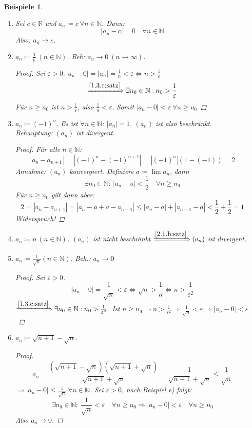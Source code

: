 \documentclass[14pt,titlepage,ngerman,a4paper,headsepline,DIV15,halfparskip*]{scrartcl}
\newcommand{\N}{\mathbb{N}}
\newcommand{\R}{\mathbb{R}}
\theoremstyle{named}
\theoremstyle{dotless}
\newtheorem*{beispiele}{Beispiele}
\begin{document}
\begin{beispiele}\
	\begin{enumerate}
		\item Sei $c \in \R$ und $a_{n} \coloneqq c ~\forall n \in \N$. Dann:
			$$
				| a_{n} - c | = 0 \quad \forall n \in \N
			$$
			Also: $a_{n} \rightarrow c$.
		\item $a_{n} \coloneqq \frac{1}{n} ~(n \in \N)$. Beh: $a_{n} \rightarrow 0 ~(n \rightarrow \infty)$.
			\begin{proof}
				Sei $\varepsilon > 0: |a_{n} - 0 | = |a_{n}| = \frac{1}{n} < \varepsilon \iff n > \frac{1}{\varepsilon}$
				$$
						\xRightarrow[]{\ref{1.3.c:satz}} \exists n_{0} \in \N: n_{0} > \frac{1}{\varepsilon}
				$$
				Für $n \geq n_{0}$ ist $n > \frac{1}{\varepsilon}$, also $\frac{1}{n} < \varepsilon$. Somit $|a_{n} - 0| < \varepsilon ~\forall n \geq n_{0}$
			\end{proof}
		\item $a_{n} \coloneqq (-1)^{n}$. Es ist $\forall n \in \N$: $|a_{n}| = 1$, $(a_{n})$ ist also beschränkt. Behauptung: $(a_{n})$ ist divergent.
			\begin{proof}
				Für alle $n \in \N$: 
				$$ |a_{n} - a_{n+1}| = |(-1)^{n} - (-1)^{n+1}| = |(-1)^{n}| \left( 1 - (-1) \right) = 2 $$
				Annahme: $(a_{n})$ konvergiert. Definiere $a \coloneqq \lim a_{n}$, dann 
				$$
					 \exists n_{0} \in \N: ~ |a_{n} - a| < \frac{1}{2} \quad \forall n \geq n_{0}
				$$
				Für $n \geq n_{0}$ gilt dann aber:
				$$
					2 = |a_{n} - a_{n+1}| = |a_{n} - a + a - a_{n + 1}| \leq |a_{n} - a| + |a_{n+1} - a| < \frac{1}{2} + \frac{1}{2} = 1
				$$
				Widerspruch!
			\end{proof}
		\item $a_{n} \coloneqq n ~(n \in \N)$. $(a_{n})$ ist nicht beschränkt $\xRightarrow[]{\ref{2.1.b:satz}} (a_{n})$ ist divergent.
		\item $a_{n} \coloneqq  \frac{1}{\sqrt{n}} (n \in \N)$. Beh.: $a_{n} \rightarrow 0$
			\begin{proof}
				Sei $\varepsilon > 0$.
				$$
					|a_{n} - 0| = \frac{1}{\sqrt{n}} < \varepsilon \iff \sqrt{n} > \frac{1}{n} \iff n > \frac{1}{\varepsilon^{2}}
				$$
				$\xRightarrow[]{\ref{1.3.c:satz}} \exists n_{0} \in \N: n_{0} > \frac{1}{\varepsilon^{2}}$. Ist $n \geq n_{0} \Rightarrow n > \frac{1}{\varepsilon^{2}} \Rightarrow \frac{1}{\sqrt{n}} < \varepsilon \Rightarrow |a_{n} - 0 | < \varepsilon$ 
			\end{proof}
		\item $a_{n} \coloneqq \sqrt{n + 1} - \sqrt{n}$. 
			\begin{proof}
				$$
					a_{n} = \frac{(\sqrt{n + 1} - \sqrt{n})(\sqrt{n + 1} + \sqrt{n})}{\sqrt{n + 1} + \sqrt{n}} = \frac{1}{\sqrt{n + 1} + \sqrt{n}} \leq \frac{1}{\sqrt{n}}
				$$
				$\Rightarrow |a_{n} - 0| \leq \frac{1}{\sqrt{n}} ~\forall n \in \N$. Sei $\varepsilon > 0$, nach Beispiel e) folgt:
				$$
					\exists n_{0} \in \N: ~ \frac{1}{\sqrt{n}} < \varepsilon \quad \forall n \geq n_{0} \Rightarrow |a_{n} - 0| < \varepsilon \quad \forall n \geq n_{0}
				$$
				Also $a_{n} \rightarrow 0$.
			\end{proof}
	\end{enumerate}
\end{beispiele}
\end{document}
